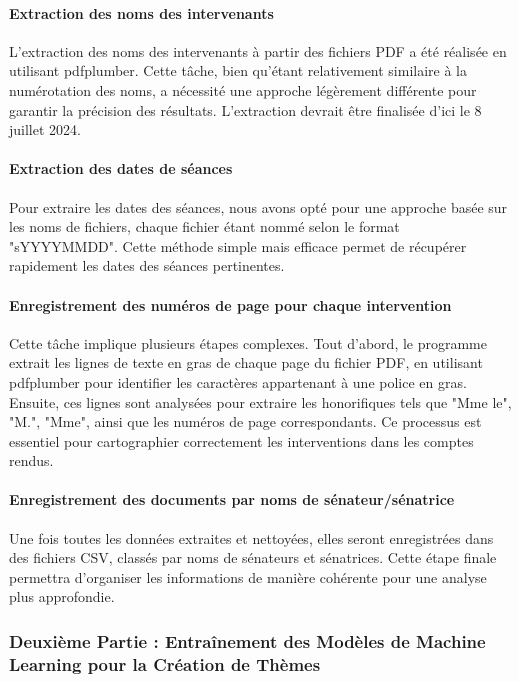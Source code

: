 \paragraph{Extraction des noms des intervenants}  
L'extraction des noms des intervenants à partir des fichiers \gls{PDF} a été réalisée en utilisant \gls{pdfplumber}. Cette tâche, bien qu'étant relativement similaire à la numérotation des noms, a nécessité une approche légèrement différente pour garantir la précision des résultats. L'extraction devrait être finalisée d'ici le 8 juillet 2024.

\paragraph{Extraction des dates de séances}  
Pour extraire les dates des séances, nous avons opté pour une approche basée sur les noms de fichiers, chaque fichier étant nommé selon le format "sYYYYMMDD". Cette méthode simple mais efficace permet de récupérer rapidement les dates des séances pertinentes.

\paragraph{Enregistrement des numéros de page pour chaque intervention}  
Cette tâche implique plusieurs étapes complexes. Tout d'abord, le programme extrait les lignes de texte en gras de chaque page du fichier \gls{PDF}, en utilisant \gls{pdfplumber} pour identifier les caractères appartenant à une police en gras. Ensuite, ces lignes sont analysées pour extraire les honorifiques tels que "Mme le", "M.", "Mme", ainsi que les numéros de page correspondants. Ce processus est essentiel pour cartographier correctement les interventions dans les comptes rendus.

\paragraph{Enregistrement des documents par noms de sénateur/sénatrice}  
Une fois toutes les données extraites et nettoyées, elles seront enregistrées dans des fichiers \gls{CSV}, classés par noms de sénateurs et sénatrices. Cette étape finale permettra d'organiser les informations de manière cohérente pour une analyse plus approfondie.

\subsubsection{Deuxième Partie : Entraînement des Modèles de Machine Learning pour la Création de Thèmes}

